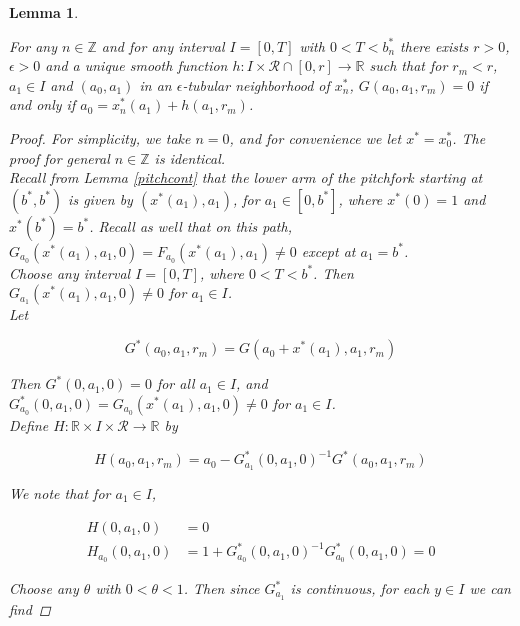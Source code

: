 \documentclass[12pt]{article}
\def\R{{\mathbb R}}
\def\Z{{\mathbb Z}}
\newtheorem{lemma}{Lemma}
\begin{document}
\begin{lemma}\label{tubepersists}

For any $n \in \Z$ and for any interval $I = [0, T]$ with $0 < T < b_n^*$ there exists $r > 0$, $\epsilon > 0$ and a unique smooth function $h: I \times \mathcal{R} \cap [0, r] \rightarrow \R$ such that for $r_m < r$, $a_1 \in I$ and $(a_0, a_1)$ in an $\epsilon$-tubular neighborhood of $x_n^*$, $G(a_0, a_1, r_m) = 0$ if and only if $a_0 = x_n^*(a_1) + h(a_1, r_m)$.

\begin{proof}

For simplicity, we take $n = 0$, and for convenience we let $x^* = x_0^*$. The proof for general $n \in \Z$ is identical. \\

Recall from Lemma \ref{pitchcont} that the lower arm of the pitchfork starting at $(b^*, b^*)$ is given by $(x^*(a_1), a_1)$, for $a_1 \in [0, b^*]$, where $x^*(0) = 1$ and $x^*(b^*) = b^*$. Recall as well that on this path, $G_{a_0}(x^*(a_1), a_1, 0) = F_{a_0}(x^*(a_1), a_1) \neq 0$ except at $a_1 = b^*$.\\

Choose any interval $I = [0, T]$, where $0 < T < b^*$. Then $G_{a_1}(x^*(a_1), a_1, 0) \neq 0$ for $a_1 \in I$.\\

Let 

\begin{equation}
G^*(a_0, a_1, r_m) = G(a_0 + x^*(a_1), a_1, r_m)
\end{equation}

Then $G^*(0, a_1, 0) = 0$ for all $a_1 \in I$, and $G^*_{a_0}(0, a_1, 0) = G_{a_0}(x^*(a_1), a_1, 0) \neq 0$ for $a_1 \in I$.\\

Define $H: \R \times I \times \mathcal{R} \rightarrow \R$ by

\begin{equation}
H(a_0, a_1, r_m) = a_0 - G^*_{a_1}(0, a_1, 0)^{-1} G^*(a_0, a_1, r_m)
\end{equation}

We note that for $a_1 \in I$,

\begin{align*}
H(0, a_1, 0) &= 0 \\
H_{a_0}(0, a_1, 0) &= 1 + G^*_{a_0}(0, a_1, 0)^{-1 }G^*_{a_0}(0, a_1, 0) = 0
\end{align*}

Choose any $\theta$ with $0 < \theta < 1$. Then since $G^*_{a_1}$ is continuous, for each $y \in I$ we can find


\end{proof}
\end{lemma}
\end{document}
